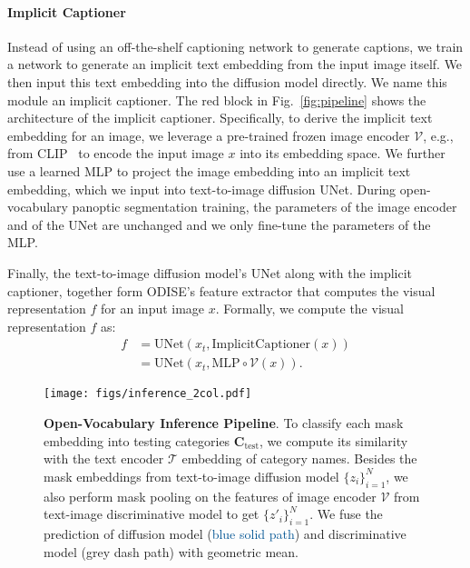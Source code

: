 \documentclass[10pt,twocolumn,letterpaper]{article}
\newcommand{\ourmethod}{ODISE}
\begin{document}
\paragraph{Implicit Captioner}
Instead of using an off-the-shelf captioning network to generate captions, we train a network to generate an implicit text embedding from the input image itself. We then input this text embedding into the diffusion model directly.
We name this module an implicit captioner.
The red block in Fig.~\ref{fig:pipeline} shows the architecture of the implicit captioner.
Specifically, to derive the implicit text embedding for an image, we leverage a pre-trained frozen image encoder $\mathcal{V}$, e.g., from CLIP~\cite{radford2021clip} to encode the input image $x$ into its embedding space. 
We further use a learned MLP to project the image embedding into an implicit text embedding, which we input into text-to-image diffusion UNet. During open-vocabulary panoptic segmentation training, the parameters of the image encoder and of the UNet are unchanged and we only fine-tune the parameters of the MLP.

Finally, the text-to-image diffusion model's UNet along with the implicit captioner, together form \ourmethod{}'s feature extractor that computes the visual representation $f$ for an input image $x$. Formally, we compute the visual representation $f$ as:
\begin{equation}
    \begin{split}
    f &=  \text{UNet}(x_t, \text{ImplicitCaptioner}(x))\\
        &=  \text{UNet}(x_t, \text{MLP}\circ \mathcal{V}(x)).
    \end{split}
\end{equation}


\begin{figure*}[t]
    \centering
    \texttt{[image: figs/inference\_2col.pdf]}
    \vspace{-1.5em}
    \caption{
        \textbf{Open-Vocabulary Inference Pipeline}.  
        To classify each mask embedding into testing categories $\mathbf{C}_\text{test}$, we compute its similarity with the text encoder $\mathcal{T}$ embedding of category names.
        Besides the mask embeddings from text-to-image diffusion model $\{z_i\}_{i=1}^N$, we also perform mask pooling on the features of image encoder $\mathcal{V}$ from text-image discriminative model to get $\{z'_i\}_{i=1}^N$.
        We fuse the prediction of diffusion model (\textcolor[HTML]{005493}{blue solid path}) and discriminative model (\textcolor[HTML]{7E7E7E}{grey dash path}) with geometric mean. 
    }
    \vspace{-.5em}
    \label{fig:inference}
\end{figure*}
\end{document}
